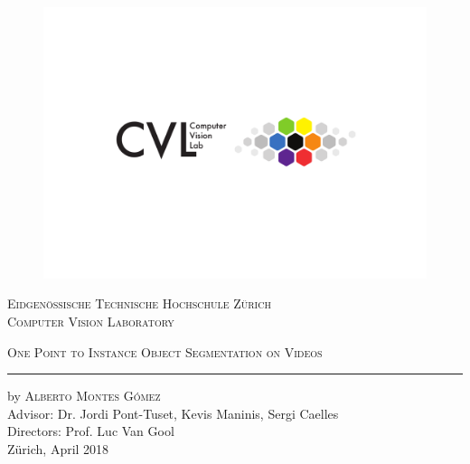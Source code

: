 
\begin{titlingpage}
\begin{center}

\begin{figure}
  \includegraphics[trim={0 6cm 0 4cm},clip,width=1\linewidth]{figures/cvl_logo.pdf}
\end{figure}

{\selectfont
\large{\textsc{Eidgen\"ossische Technische Hochschule Z\"urich\\[1mm]
Computer Vision Laboratory\\[25mm]}}

\huge{\textsc{One Point to Instance Object Segmentation on Videos}}
\vskip 0.5cm
\hrule
\vskip 2.6cm

\Large
by \textsc{Alberto Montes G\'omez}\\[2cm]

\large
Advisor: Dr. Jordi Pont-Tuset, Kevis Maninis, Sergi Caelles\\
Directors: Prof. Luc Van Gool\\
Z\"urich, April 2018}
\end{center}
\end{titlingpage}
